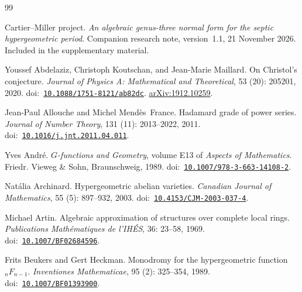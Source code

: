 \documentclass[11pt]{amsart}
\theoremstyle{definition}
\theoremstyle{remark}
\numberwithin{equation}{section}
\begin{document}
\begin{thebibliography}{99}
\providecommand{\natexlab}[1]{#1}
\providecommand{\url}[1]{\texttt{#1}}
\providecommand{\doi}[1]{}
\renewcommand{\doi}[1]{doi:~\href{https://doi.org/#1}{\nolinkurl{#1}}}
\providecommand{\arxiv}[1]{}
\renewcommand{\arxiv}[1]{\href{https://arxiv.org/abs/#1}{arXiv:#1}}

Cartier--Miller project.
\newblock \emph{An algebraic genus-three normal form for the septic hypergeometric period}.
\newblock Companion research note, version~1.1, 21 November 2026. Included in the supplementary material.

Youssef Abdelaziz, Christoph Koutschan, and Jean-Marie Maillard.
\newblock On {C}hristol's conjecture.
\newblock \emph{Journal of Physics A: Mathematical and Theoretical},
  53 (20): 205201, 2020.
\newblock \doi{10.1088/1751-8121/ab82dc}.
\newblock \arxiv{1912.10259}.

Jean-Paul Allouche and Michel Mend{\`e}s~France.
\newblock Hadamard grade of power series.
\newblock \emph{Journal of Number Theory}, 131 (11):
  2013--2022, 2011.
\newblock \doi{10.1016/j.jnt.2011.04.011}.

Yves Andr{\'e}.
\newblock \emph{{$G$}-functions and Geometry}, volume E13 of \emph{Aspects of
  Mathematics}.
\newblock Friedr. Vieweg \& Sohn, Braunschweig, 1989.
\newblock \doi{10.1007/978-3-663-14108-2}.

Nat{\'a}lia Archinard.
\newblock Hypergeometric abelian varieties.
\newblock \emph{Canadian Journal of Mathematics}, 55 (5):
  897--932, 2003.
\newblock \doi{10.4153/CJM-2003-037-4}.

Michael Artin.
\newblock Algebraic approximation of structures over complete local rings.
\newblock \emph{Publications Math{\'e}matiques de l'IH{\'E}S}, 36:
  23--58, 1969.
\newblock \doi{10.1007/BF02684596}.

Frits Beukers and Gert Heckman.
\newblock Monodromy for the hypergeometric function {${}_nF_{n-1}$}.
\newblock \emph{Inventiones Mathematicae}, 95 (2): 325--354,
  1989.
\newblock \doi{10.1007/BF01393900}.


\end{thebibliography}
\end{document}
